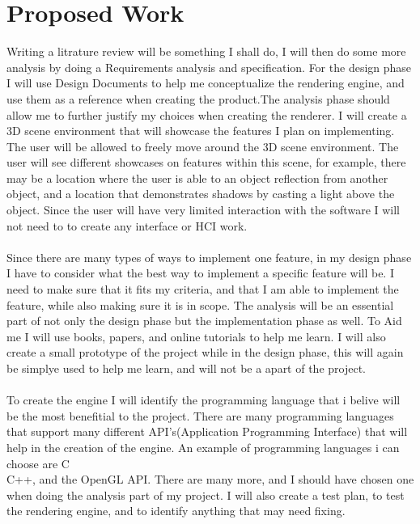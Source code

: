 \documentclass[]{article}
\begin{document}
\section{Proposed Work}
Writing a litrature review will be something I shall do, I will then do some more analysis by doing a  Requirements analysis and specification.
For the design phase I will use Design Documents to help me conceptualize the rendering engine, and use them as a reference when creating the product.The analysis phase should allow me to further justify my choices when creating the renderer.
I will create a 3D scene environment that will showcase the features I plan on implementing. The user will be allowed to freely move around the 3D scene environment. 
The user will see different showcases on features within this scene, for example, there may be a location where the user is able to an object reflection from another object, and a location that demonstrates shadows by casting a light above the object. Since the user will have very limited interaction with the software I will not need to to create any interface or HCI work.
\\\\
Since there are many types of ways to implement one feature, in my design phase I have to consider what the best way to implement a specific feature will be. I need to make sure that it fits my criteria, and that I am able to implement the feature, while also making sure it is in scope. The analysis will be an essential part of not only the design phase but the implementation phase as well.
To Aid me I will use books, papers, and online tutorials to help me learn.
I will also create a small prototype of the project while in the design phase, this will again be simplye used to help me learn, and will not be a apart of the project.
\\\\
To create the engine I will identify the programming language that i belive will be the most benefitial to the project.
There are many programming languages that support many different API's(Application Programming Interface) that will help in the creation of the engine. An example of programming languages i can choose are C\\C++, and the OpenGL API. There are many more, and I should have chosen one when doing the analysis part of my project.
I will also create a test plan, to test the rendering engine, and to identify anything that may need fixing.
\end{document}
